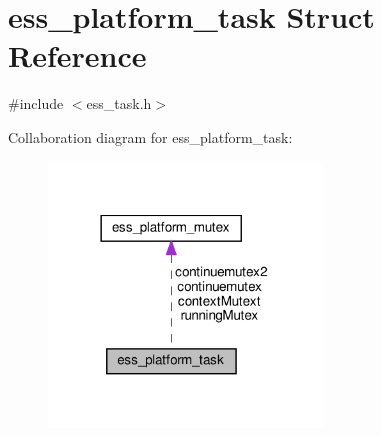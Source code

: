 \hypertarget{structess__platform__task}{}\section{ess\+\_\+platform\+\_\+task Struct Reference}
\label{structess__platform__task}


{\ttfamily \#include $<$ess\+\_\+task.\+h$>$}



Collaboration diagram for ess\+\_\+platform\+\_\+task\+:
\nopagebreak
\begin{figure}[H]
\begin{center}
\leavevmode
\includegraphics[width=206pt]{dd/d0e/structess__platform__task__coll__graph}
\end{center}
\end{figure}
